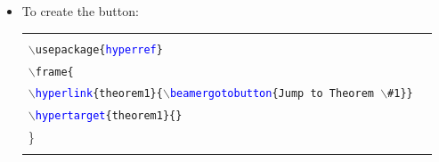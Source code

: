 \documentclass[compress]{beamer}
\begin{document}
{\begin{itemize}
	OR, \texttt{$\backslash$label\{theorem1\}} \\\vspace{.1cm}
	\item \footnotesize To create the button:\\\vspace{.1cm}
\tiny
	\begin{tabular}{|ll|}
	\hline
	&\\
	\texttt{$\backslash$usepackage\{\textcolor{Blue}{hyperref}\}} &\\
	\texttt{$\backslash$frame\{} &\\
	\texttt{$\backslash$\textcolor{Blue}{hyperlink}\{theorem1\}\{$\backslash$\textcolor{Blue}{beamergotobutton}\{Jump to Theorem $\backslash$\#1\}\}} &\\
	\texttt{$\backslash$\textcolor{Blue}{hypertarget}\{theorem1\}\{\}} &\\
	\}&\\
	&\\\hline 
	\end{tabular}
\end{itemize}
}

\end{document}
